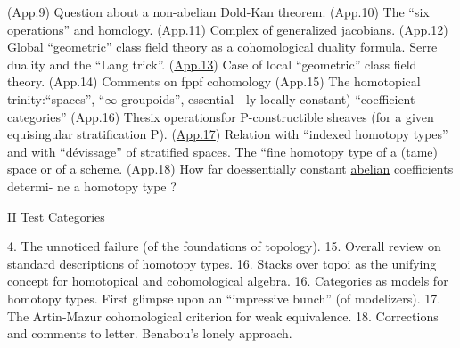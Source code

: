 (App.9)  Question about a non-abelian Dold-Kan theorem.
(App.10) The ``six operations'' and homology.
(\uline{App.11}) Complex of generalized jacobians.
(\uline{App.12}) Global ``geometric'' class field theory as a cohomological
duality formula. Serre duality and the ``Lang trick''.
(\uline{App.13}) Case of local ``geometric'' class field theory.
(App.14) Comments on fppf cohomology   
(App.15) The homotopical trinity:\deleted{\hand{(}}``spaces'', ``$\infty$-groupoids'', \hand{(}essential-%
-ly locally constant) ``coefficient categories''
(App.16) Thesix operationsfor P-constructible sheaves (for a given
equisingular stratification P).
(\uline{App.17}) Relation with ``indexed homotopy types'' and with ``dévissage''
of stratified spaces. The ``fine homotopy type of a (tame)
space or of a scheme.
(App.18) How far doessentially constant \uline{abelian} coefficients determi-%
ne a homotopy type ?

II \uline{Test Categories}

4. The unnoticed failure (of the foundations of topology).
15. Overall review on standard descriptions of homotopy types.
16. Stacks over topoi as the unifying concept for homotopical and
cohomological algebra.
16. Categories as models for homotopy types. First glimpse upon an
``impressive bunch'' (of modelizers).
17. The Artin-Mazur cohomological criterion for weak equivalence.
18. Corrections and comments to letter. Benabou's lonely approach.

